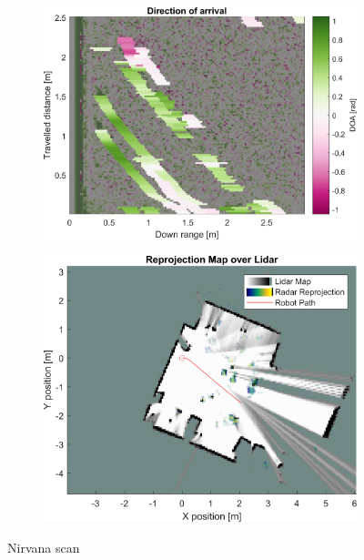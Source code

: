 \begin{figure}[htbp]
\begin{subfigure}[t]{0.475\linewidth}
        \includegraphics[width=\linewidth,max height=.475\textheight]{gfx/results/nirvana_doa.png}
    \end{subfigure}%
    \hfill%
    \begin{subfigure}[t]{0.475\linewidth}   
        \centering 
        \includegraphics[width=\linewidth,max height=.475\textheight]{gfx/results/nirvana_map.png}
    \end{subfigure}%
    \caption{Nirvana scan}
\end{figure}


